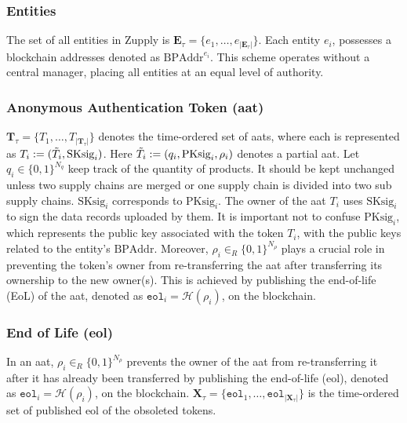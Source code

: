 \subsubsection{Entities}
\label{sec:Entities}
The set of all entities in Zupply is $\mathbf{E}_\tau = \{e_1, \dots, e_{|\mathbf{E}_\tau|}\}$. Each entity $e_i$, possesses a blockchain addresses denoted as $\text{BPAddr}^{e_i}$.  
This scheme operates without a central manager, placing all entities at an equal level of authority.

\subsubsection{Anonymous Authentication Token (\gls{aat})}
$\mathbf{T}_\tau = \{T_1, \dots, T_{|\mathbf{T}_\tau|}\}$ denotes the time-ordered set of \gls{aat}s, where each is represented as $T_i := (\Tilde{T}_i, \text{SKsig}_{i})$. Here $\Tilde{T}_i := (q_i, \text{PKsig}_{i}, \rho_i)$ denotes a partial \gls{aat}. Let $q_i \in \{0, 1\}^{N_q}$ keep track of the quantity of products. It should be kept unchanged unless two supply chains are merged or one supply chain is divided into two sub supply chains. $\text{SKsig}_{i}$ corresponds to $\text{PKsig}_{i}$. The owner of the \gls{aat} $T_i$ uses $\text{SKsig}_{i}$ to sign the data records uploaded by them. It is important not to confuse $\text{PKsig}_{i}$, which represents the public key associated with the token $T_i$, with the public keys related to the entity's $\text{BPAddr}$. 
Moreover, $\rho_i \in_R \{0, 1\}^{N_\rho}$ plays a crucial role in preventing the token's owner from re-transferring the \gls{aat} after transferring its ownership to the new owner(s). This is achieved by publishing the end-of-life (EoL) of the \gls{aat}, denoted as $\texttt{eol}_i = \mathcal{H}(\rho_i)$, on the blockchain. %

\subsubsection{End of Life (\gls{eol})}
In an \gls{aat}, $\rho_i \in_R \{0, 1\}^{N_\rho}$ prevents the owner of the \gls{aat} from re-transferring it after it has already been transferred by publishing the end-of-life (\gls{eol}), denoted as $\texttt{eol}_i = \mathcal{H}(\rho_i)$, on the blockchain.
$\mathbf{X}_\tau = \{\texttt{eol}_1, \dots, \texttt{eol}_{|\mathbf{X}_\tau|}\}$ is the time-ordered set of published \gls{eol} of the obsoleted tokens. %


